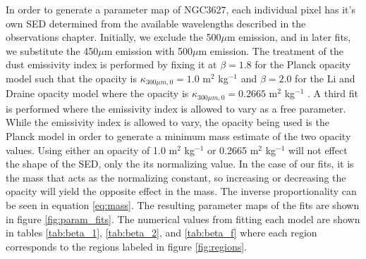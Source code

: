 In order to generate a parameter map of NGC3627, each individual pixel has it's own SED determined from the available wavelengths described in the observations chapter.  Initially, we exclude the 500$\mu$m emission, and in later fits, we substitute the 450$\mu$m emission with 500$\mu$m emission.  The treatment of the dust emissivity index is performed by fixing it at $\beta=1.8$ for the Planck opacity model such that the opacity is $\kappa_{300\mu m,0}=1.0$ m$^2$ kg$^{-1}$ \citep{planckxxv2011} and $\beta=2.0$ for the Li and Draine opacity model where the opacity is $\kappa_{300\mu m,0}=0.2665$ m$^2$ kg$^{-1}$ \citep{li2001}.  A third fit is performed where the emissivity index is allowed to vary as a free parameter.  While the emissivity index is allowed to vary, the opacity being used is the Planck model in order to generate a minimum mass estimate of the two opacity values.  Using either an opacity of 1.0 m$^2$ kg$^{-1}$ or 0.2665 m$^2$ kg$^{-1}$ will not effect the shape of the SED, only the its normalizing value.  In the case of our fits, it is the mass that acts as the normalizing constant, so increasing or decreasing the opacity will yield the opposite effect in the mass.  The inverse proportionality can be seen in equation \ref{eq:mass}.  The resulting parameter maps of the fits are shown in figure \ref{fig:param_fits}. The numerical values from fitting each model are shown in tables \ref{tab:beta_1}, \ref{tab:beta_2}, and \ref{tab:beta_f} where each region corresponds to the regions labeled in figure \ref{fig:regions}.

